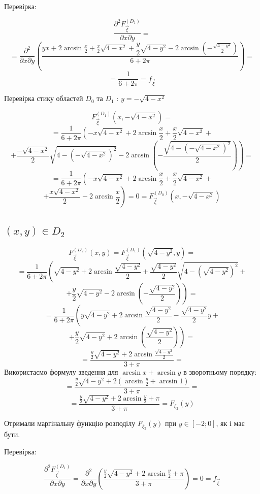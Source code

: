 \documentclass[14pt, a4paper, ukrainian]{extreport}
\begin{document}
	Перевірка: 
	
	$$\frac{\partial^2F_{\vec\xi}^{\left(D_1\right)}}{\partial x \partial y} = 
	$$
	$$ = \frac{\partial^2}{\partial x \partial y}\left(\dfrac{yx + 2\arcsin\frac{x}{2} + \frac{x}{2}\sqrt{4-x^2} + \dfrac{y}{2}\sqrt{4-y^2} - 2\arcsin{\left(-\frac{\sqrt{4-y^2}}{2}\right)}}{6+2\pi}\right) =
	$$
	$$	= \frac{1}{6+2\pi} = f_{\vec{\xi}}
	$$
	
	Перевірка стику областей $D_0$ та $D_1$ : $ y = -\sqrt{4-x^2}$
	
	$$ F_{\vec\xi}^{\left({D_1}\right)}(x, -\sqrt{4-x^2}) = 
	$$
	$$ = \frac{1}{6+2\pi} \left(-x\sqrt{4-x^2} + 2\arcsin\frac{x}{2} + \frac{x}{2}\sqrt{4-x^2}+ \right.
	$$
	$$ \left.+ \dfrac{-\sqrt{4-x^2}}{2}\sqrt{4-\left(-\sqrt{4-x^2}\right)^2} - 2\arcsin{\left(-\frac{\sqrt{4-\left(-\sqrt{4-x^2}\right)^2}}{2}\right)}\right) = 
	$$
	$$ = \frac{1}{6+2\pi} \left(-x\sqrt{4-x^2} + 2\arcsin\frac{x}{2} + \frac{x}{2}\sqrt{4-x^2}+ \right.
	$$
	$$ \left.+ \dfrac{x\sqrt{4-x^2}}{2} - 2\arcsin{\frac{x}{2}}\right) = 0 = F_{\vec\xi}^{\left({D_0}\right)}(x, -\sqrt{4-x^2})
	$$
	
	\subsection{$(x, y) \in D_2 $}
	
	$$ F_{\vec \xi}^{\left(D_2\right)}(x, y) = F_{\vec \xi}^{\left(D_1\right)}(\sqrt{4-y^2}, y) = 
	$$
	$$ = \dfrac{1}{6+2\pi}\left(\sqrt{4-y^2} + 2\arcsin\frac{\sqrt{4-y^2}}{2} + \frac{\sqrt{4-y^2}}{2}\sqrt{4-(\sqrt{4-y^2})^2} + \right. 
	$$
	$$ \left. + \dfrac{y}{2}\sqrt{4-y^2} - 2\arcsin{\left(-\frac{\sqrt{4-y^2}}{2}\right)}\right) = 
	$$
	$$ = \dfrac{1}{6+2\pi}\left(y\sqrt{4-y^2} + 2\arcsin\frac{\sqrt{4-y^2}}{2} - \frac{\sqrt{4-y^2}}{2}y + \right. 
	$$
	$$ \left. + \dfrac{y}{2}\sqrt{4-y^2} + 2\arcsin{\left(\frac{\sqrt{4-y^2}}{2}\right)}\right) = 
	$$
	$$ = \dfrac{\frac{y}{2}\sqrt{4-y^2} + 2\arcsin\frac{\sqrt{4-y^2}}{2}}{3+\pi} = 
	$$
	Використаємо формулу зведення для $\arcsin{x} + \arcsin{y}$ в зворотньому порядку:
	$$ = \dfrac{\frac{y}{2}\sqrt{4-y^2} + 2\left(\arcsin\frac{y}{2} + \arcsin{1}\right)}{3+\pi} = 
	$$
	$$ = \dfrac{\frac{y}{2}\sqrt{4-y^2} + 2\arcsin\frac{y}{2} + \pi}{3+\pi} = F_{\xi_2} (y)
	$$
	
	Отримали маргінальну функцію розподілу $ F_{\xi_2} (y) $ при $y \in [-2; 0]$, як і має бути.
	
	Перевірка:
	
	$$\frac{\partial^2F_{\vec\xi}^{\left(D_1\right)}}{\partial x \partial y} = \frac{\partial^2}{\partial x \partial y}\left(\dfrac{\frac{y}{2}\sqrt{4-y^2} + 2\arcsin\frac{y}{2} + \pi}{3+\pi} \right) = 0 = f_{\vec\xi}
	$$
	
\end{document}
